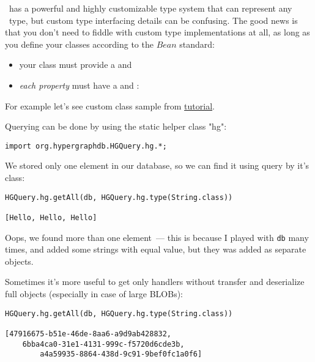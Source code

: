 
\hgdb\ has a powerful and highly customizable type system that can represent any
\java\ type, but custom type interfacing details can be confusing. The good news
is that you don't need to fiddle with custom type implementations at all,
as long as you define your classes according to the \java$Bean$ standard:
\begin{itemize}[nosep]
\item your class must provide a  and
\item \emph{each property} must have a  and :
\end{itemize}

For example let's see custom class sample from
\href{https://github.com/hypergraphdb/hypergraphdb/wiki/GettingStarted}{tutorial}.

\clearpage
{}

Querying can be done by using the static helper class "hg":
\begin{verbatim}
import org.hypergraphdb.HGQuery.hg.*;
\end{verbatim}

We stored only one element in our database, so we can find it using query by
it's class:
\begin{verbatim}
HGQuery.hg.getAll(db, HGQuery.hg.type(String.class))

[Hello, Hello, Hello]
\end{verbatim}

Oops, we found more than one element\ --- this is because I played with
\verb$db$ many times, and added some strings with equal value, but they was
added as separate objects.

\clearpage
Sometimes it's more useful to get only handlers without transfer and deserialize
full objects (especially in case of large BLOBs):
\begin{verbatim}
HGQuery.hg.getAll(db, HGQuery.hg.type(String.class))

[47916675-b51e-46de-8aa6-a9d9ab428832, 
    6bba4ca0-31e1-4131-999c-f5720d6cde3b, 
        a4a59935-8864-438d-9c91-9bef0fc1a0f6]
\end{verbatim}

\clearpage
{}

